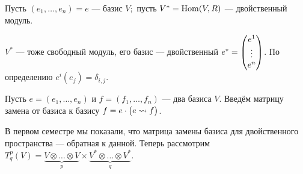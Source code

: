 Пусть $(e_1, \dots, e_n) = e$ --- базис $V$;\ пусть $V^* = \operatorname{Hom}(V, R)$ --- двойственный модуль.

$V^*$ --- тоже свободный модуль, его базис --- двойственный $e^* = \begin{pmatrix}e^1\\ \vdots\\ e^n\end{pmatrix}$.
По определению $e^i(e_j) = \delta_{i,j}$.

Пусть $e = (e_1, \dots, e_n)$ и $f = (f_1, \dots, f_n)$ --- два базиса $V$.
Введём матрицу замена от базиса к базису $f = e\cdot \begin{pmatrix}e \rightsquigarrow f\end{pmatrix}$.

В первом семестре мы показали, что матрица замены базиса для двойственного пространства --- обратная к данной.
Теперь рассмотрим $T^p_q(V) = \underbrace{V \otimes \dots \otimes V}_p \times \underbrace{V^* \otimes \dots \otimes V^*}_q$.

